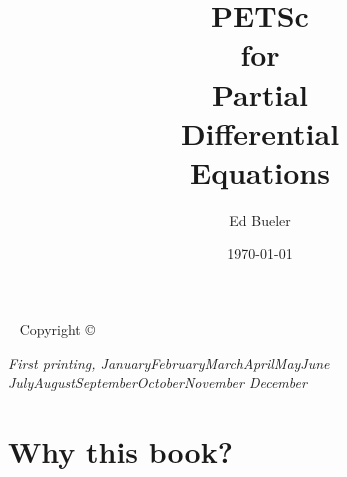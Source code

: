 \documentclass{tufte-book}
\title[PETSc for PDEs]{PETSc \\ for \\ Partial \\ Differential \\ Equations}
\author{Ed Bueler}
\date{\today}
\theoremstyle{definition}
\newcommand{\openepigraph}[2]{%
  \begin{fullwidth}
  \sffamily\large
  \begin{doublespace}
  \noindent\allcaps{#1}\\%
  \noindent \Large \allcaps{#2}%
  \end{doublespace}
  \end{fullwidth}
}
\newcommand{\monthyear}{%
  \ifcase\month\or January\or February\or March\or April\or May\or June\or
  July\or August\or September\or October\or November\or
  December\fi\space\number\year
}
\begin{document}
\begin{comment}
\newpage\thispagestyle{empty}
\openepigraph{%
\dots when there are disputes among persons, we can simply say: Let us calculate, without further ado, to see who is right.
}{Gottfried Wilhelm Leibniz}
\vfill
\openepigraph{%
Developing parallel, nontrivial PDE solvers that deliver high performance is still difficult and requires months (or even years) of concentrated effort.  PETSc is a toolkit that can ease these difficulties and reduce the development time, but it is not a black-box PDE solver, nor a silver bullet
}{Barry Smith}
\vfill
\openepigraph{%
Tufte's style is known for its extensive use of sidenotes, tight integration of graphics with text, and well-set typography.
}{The Tufte-LaTeX\ Developers}
\vfill

\frontmatter
\end{comment}

\maketitle

\newpage
\begin{fullwidth}
~\vfill
\thispagestyle{empty}
\setlength{\parindent}{0pt}
\setlength{\parskip}{\baselineskip}
Copyright \copyright\ \the\year\ \thanklessauthor

\par{}


\par\textit{First printing, \monthyear}
\end{fullwidth}

\tableofcontents

\begin{comment}
\cleardoublepage
~\vfill
\begin{doublespace}
\noindent\fontsize{18}{22}\selectfont\itshape
\nohyphenation
Thanks to \mbox{Jed Brown} and \mbox{Constantine Khroulev}, fellow students, and gurus.
\end{doublespace}
\vfill
\end{comment}


\chapter{Why this book?}
\end{document}
